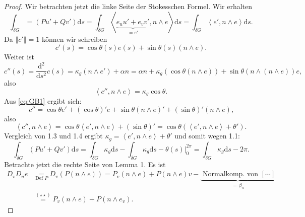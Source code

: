 \begin{theorem}
\begin{proof}
    Wir betrachten jetzt die linke Seite der Stokesschen Formel. Wir erhalten
    \begin{equation}\label{eq:GB1}
      \int_{\delta G} = (Pu' + Qv')\text{d}s = \int_{\delta G}\left\langle \underbrace{e_u u' + e_v v'}_{=e'}, n \wedge e \right\rangle \text{d}s = \int_{\delta G}\left\langle e', n \wedge e \right\rangle \text{d}s\text{.}
    \end{equation}
    Da \( \left\Vert c' \right\Vert = 1 \) können wir schreiben
    \begin{equation}\label{eq:GB2}
      c'(s) = \cos\theta(s)e(s) + \sin\theta(s)(n \wedge e)\text{.}
    \end{equation}
    Weiter ist
    \begin{equation*}
      c''(s) = \frac{\text{d}^2}{\text{d}s^2}c(s) = \kappa_g(n \wedge e') + \alpha n = \alpha n + \kappa_g(\cos\theta(n \wedge e)) + \sin\theta(n \wedge (n \wedge e))e\text{,}
    \end{equation*}
    also
    \begin{equation}\label{eq:GB3}
      \left\langle c'', n \wedge e \right\rangle = \kappa_g\cos\theta\text{.}
    \end{equation}
    Aus \autoref{eq:GB1} ergibt sich:
    \begin{equation*}
      c'' = \cos\theta e' + (\cos\theta)'e + \sin\theta(n \wedge e)' + (\sin\theta)'(n\wedge e)\text{,}
    \end{equation*}
    also
    \begin{equation}\label{eq:GB4}
      \left\langle c'', n \wedge e \right\rangle = \cos\theta \left\langle e', n \wedge e \right\rangle + (\sin\theta)' = \cos\theta\left(\left\langle e', n \wedge e \right\rangle + \theta'\right)\text{.}
    \end{equation}
    Vergleich von 1.3 und 1.4 ergibt \( \kappa_g = \left\langle e', n \wedge e \right\rangle + \theta' \) und somit wegen 1.1:
    \begin{equation*}
      \int_{\delta G}(Pu' + Qv')\text{d}s = \int_{\delta G}\kappa_g\text{d}s - \int_{\delta G}\kappa_g\text{d}s - \theta(s)\vert_{0}^{2\pi} = \int_{\delta G}\kappa_g\text{d}s - 2\pi\text{.}
    \end{equation*}
    Betrachte jetzt die rechte Seite von Lemma 1. Es ist
    \begin{align*}
      D_v D_u e &\underset{\text{Def }P}{=}D_v(P(n \wedge e)) = P_v(n \wedge e) + P(n\wedge e)v - \underbrace{\text{ Normalkomp.\ von } [\cdots]}_{\eqqcolon \beta_n} \\ &\overset{(\star\star)}{=} P_v(n \wedge e) + P(n \wedge e_v)\text{.}

\end{align*}
\end{proof}
\end{theorem}
